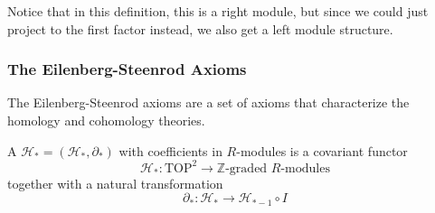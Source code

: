 \documentclass[a4paper,11pt]{article}
\begin{document}
\begin{remark}
    Notice that in this definition, this is a right module, but since we could just project to the first factor instead, we also get a left module structure.
\end{remark}

\subsubsection{The Eilenberg-Steenrod Axioms}\label{es axioms}
The Eilenberg-Steenrod axioms are a set of axioms that characterize the homology and cohomology theories.

\begin{definition}
    A  \(\mathcal{H}_\ast=(\mathcal{H}_\ast,\partial_\ast)\) with coefficients in \(R\)-modules is a covariant functor\[\mathcal{H}_\ast:\mathrm{TOP}^2\to\mathbb{Z}\text{-graded }R\text{-modules}\]
    together with a natural transformation \[\partial_\ast:\mathcal{H}_\ast\to\mathcal{H}_{\ast-1}\circ I\]
    

\end{definition}
\end{document}
